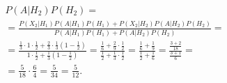 \begin{enumerate}[label=\alph*)]
\begin{equation*}
\begin{split}
{P \left( \left. A \right| H_2 \right) P \left( H_2 \right) } = \\
= \frac{P \left( \left. X_2 \right| H_1 \right) P \left( \left. A \right| H_1 \right) P \left( H_1 \right) +
P \left( \left. X_2 \right| H_2 \right) P \left( \left. A \right| H_2 \right) P \left( H_2 \right)}{P \left( \left. A \right| H_1 \right) P \left( H_1 \right) +
P \left( \left. A \right| H_2 \right) P \left( H_2 \right) } = \\
= \frac{ \frac{1}{3} \cdot 1 \cdot \frac{1}{2} + \frac{2}{3} \cdot \frac{1}{3} \left( 1 - \frac{1}{2} \right) }{1 \cdot \frac{1}{2} +
\frac{1}{3} \left( 1 - \frac{1}{2} \right) } =
\frac{ \frac{1}{6} + \frac{2}{9} \cdot \frac{1}{2} }{ \frac{1}{2} + \frac{1}{3} \cdot \frac{1}{2} } =
\frac{ \frac{1}{6} + \frac{1}{9} }{ \frac{1}{2} + \frac{1}{6} } =
\frac{ \frac{3+2}{18} }{ \frac{3+1}{6} } = \\
= \frac{5}{18} \cdot \frac{6}{4} =
\frac{5}{34} =
\frac{5}{12}.
\end{split}
\end{equation*}
\end{enumerate}
